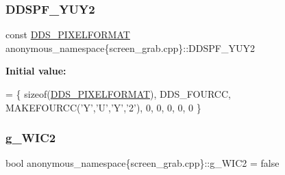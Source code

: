\subsubsection{\texorpdfstring{D\+D\+S\+P\+F\+\_\+\+Y\+U\+Y2}{DDSPF\_YUY2}}
{\footnotesize\ttfamily const \mbox{\hyperlink{structanonymous__namespace_02screen__grab_8cpp_03_1_1_d_d_s___p_i_x_e_l_f_o_r_m_a_t}{D\+D\+S\+\_\+\+P\+I\+X\+E\+L\+F\+O\+R\+M\+AT}} anonymous\+\_\+namespace\{screen\+\_\+grab.\+cpp\}\+::D\+D\+S\+P\+F\+\_\+\+Y\+U\+Y2}

{\bfseries Initial value\+:}
\begin{DoxyCode}
=
        \{ \textcolor{keyword}{sizeof}(\mbox{\hyperlink{struct_d_d_s___p_i_x_e_l_f_o_r_m_a_t}{DDS\_PIXELFORMAT}}), DDS\_FOURCC, MAKEFOURCC(\textcolor{charliteral}{'Y'},\textcolor{charliteral}{'U'},\textcolor{charliteral}{'Y'},\textcolor{charliteral}{'2'}), 0, 0, 0, 0, 0 \}
\end{DoxyCode}
\mbox{\label{namespaceanonymous__namespace_02screen__grab_8cpp_03_aec5aa7341163ab3b613da3e0af287f9f}} 
\subsubsection{\texorpdfstring{g\+\_\+\+W\+I\+C2}{g\_WIC2}}
{\footnotesize\ttfamily bool anonymous\+\_\+namespace\{screen\+\_\+grab.\+cpp\}\+::g\+\_\+\+W\+I\+C2 = false}

